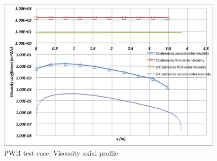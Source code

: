 \documentclass[12pt]{article}
\begin{document}
\begin{figure}[h]
\centering
\includegraphics[scale=0.4]{plots/Viscosity.png}
\caption{PWR test case: Viscosity axial profile}
\label{fig:Viscosity}
\end{figure}
\end{document}
